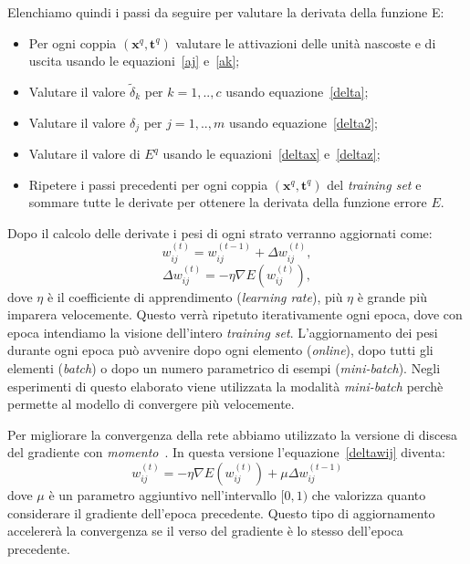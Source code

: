 \documentclass[11pt,a4paper,twoside,
openright]{book}
\begin{document}
Elenchiamo quindi i passi da seguire per valutare la derivata della funzione E:
\begin{itemize}
\item Per ogni coppia $(\textbf{x}^q,\textbf{t}^q)$ valutare le attivazioni delle unità nascoste e di uscita usando le equazioni~\eqref{aj} e~\eqref{ak};
\item Valutare il valore $\tilde{\delta}_k$ per $k=1,..,c$ usando equazione~\eqref{delta};
\item Valutare il valore $\delta_j$ per $j=1,..,m$ usando equazione~\eqref{delta2};
\item Valutare il valore di $E^q$ usando le equazioni~\eqref{deltax} e~\eqref{deltaz};
\item Ripetere i passi precedenti per ogni coppia $(\textbf{x}^q,\textbf{t}^q)$ del \textit{training set} e sommare tutte le derivate per ottenere la derivata della funzione errore $E$.
\end{itemize}

Dopo il calcolo delle derivate i pesi di ogni strato verranno aggiornati come:
\begin{equation}
w_{ij}^{(t)}=w_{ij}^{(t-1)} + \Delta w_{ij}^{(t)},
\label{update_w_ij}
\end{equation}
\begin{equation}
\Delta w_{ij}^{(t)} = -\eta \nabla E(w_{ij}^{(t)}),
\label{deltawij}
\end{equation}
dove $\eta$ è il coefficiente di apprendimento (\textit{learning rate}), più $\eta$ è grande più imparera velocemente.
Questo verrà ripetuto iterativamente ogni epoca, dove con epoca intendiamo la visione dell'intero \textit{training set}.
L'aggiornamento dei pesi durante ogni epoca può avvenire dopo ogni elemento (\textit{online}), dopo tutti gli elementi (\textit{batch}) o dopo un numero parametrico di esempi (\textit{mini-batch}).
Negli esperimenti di questo elaborato viene utilizzata la modalità \textit{mini-batch} perchè permette al modello di convergere più velocemente.

Per migliorare la convergenza della rete abbiamo utilizzato la versione di discesa del gradiente con \textit{momento}~\cite{journals/nn/Qian99}.
In questa versione l'equazione~\eqref{deltawij} diventa:
\begin{equation}
w_{ij}^{(t)}=- \eta \nabla E(w_{ij}^{(t)}) + \mu \Delta w_{ij}^{(t-1)}
\label{momentum}
\end{equation}
dove $\mu$ è un parametro aggiuntivo nell'intervallo $[0,1)$ che valorizza quanto considerare il gradiente dell'epoca precedente. 
Questo tipo di aggiornamento accelererà la convergenza se il verso del gradiente è lo stesso dell'epoca precedente. 
\end{document}
